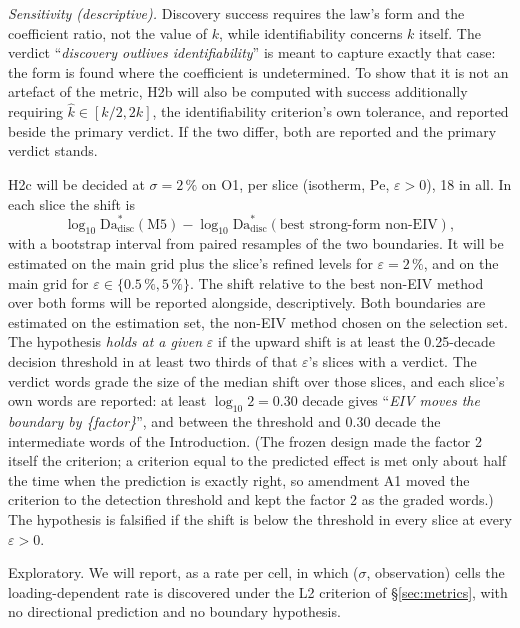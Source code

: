 \documentclass[11pt]{article}
\newcommand{\Da}{\mathrm{Da}}
\newcommand{\Pe}{\mathrm{Pe}}
\newcommand{\verdict}[1]{``\textit{#1}''}
\begin{document}
\begin{description}
\emph{Sensitivity (descriptive).} Discovery success requires the law's form and the
coefficient ratio, not the value of $k$, while identifiability concerns $k$ itself. The
verdict \verdict{discovery outlives identifiability} is meant to capture exactly that case:
the form is found where the coefficient is undetermined. To show that it is not an artefact
of the metric, H2b will also be computed with success additionally requiring
$\hat k \in [k/2, 2k]$, the identifiability criterion's own tolerance, and reported beside
the primary verdict. If the two differ, both are reported and the primary verdict stands.
\item[H2c.] H2c will be decided at $\sigma = 2\,\%$ on O1, per slice (isotherm, $\Pe$,
$\varepsilon > 0$), 18 in all. In each slice the shift is
\[
\log_{10}\Da^{*}_{\mathrm{disc}}(\text{M5}) - \log_{10}\Da^{*}_{\mathrm{disc}}(\text{best
strong-form non-EIV}),
\]
with a bootstrap interval from paired resamples of the two boundaries. It will be estimated
on the main grid plus the slice's refined levels for $\varepsilon = 2\,\%$, and on the main
grid for $\varepsilon \in \{0.5\,\%, 5\,\%\}$. The shift relative to the best non-EIV method
over both forms will be reported alongside, descriptively. Both boundaries are estimated on
the estimation set, the non-EIV method chosen on the selection set. The hypothesis
\emph{holds at a given} $\varepsilon$ if the upward shift is at least the 0.25-decade
decision threshold in at least two thirds of that $\varepsilon$'s slices with a verdict. The
verdict words grade the size of the median shift over those slices, and each slice's own
words are reported: at least $\log_{10}2 = 0.30$ decade gives \verdict{EIV moves the
boundary by \{factor\}}, and between the threshold and 0.30 decade the intermediate words of
the Introduction. (The frozen design made the factor 2 itself the criterion; a criterion
equal to the predicted effect is met only about half the time when the prediction is
exactly right, so amendment A1 moved the criterion to the detection threshold and kept the
factor 2 as the graded words.) The hypothesis is falsified if the shift is below the
threshold in every slice at every $\varepsilon > 0$.
\item[H2d.] Exploratory. We will report, as a rate per cell, in which ($\sigma$,
observation) cells the loading-dependent rate is discovered under the L2 criterion of
\S\ref{sec:metrics}, with no directional prediction and no boundary hypothesis.
\end{description}
\end{document}
